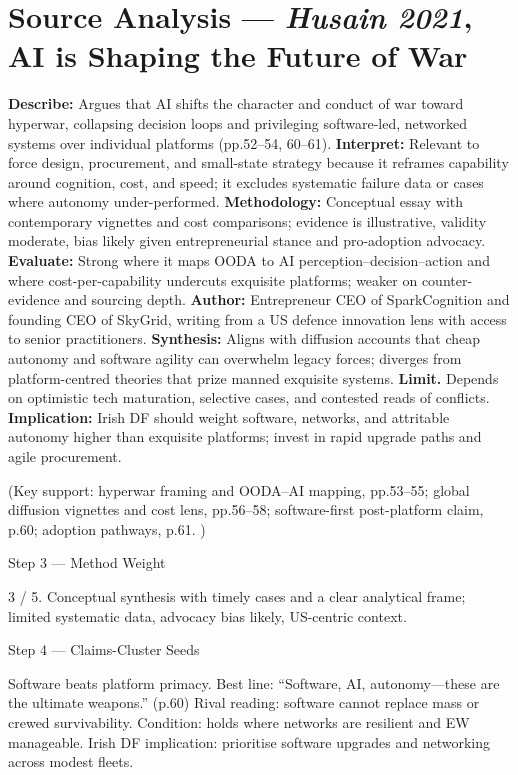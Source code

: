 \section*{Source Analysis — \textit{Husain 2021}, AI is Shaping the Future of War}
\textbf{Describe:} Argues that AI shifts the character and conduct of war toward hyperwar, collapsing decision loops and privileging software-led, networked systems over individual platforms (pp.52–54, 60–61).
\textbf{Interpret:} Relevant to force design, procurement, and small-state strategy because it reframes capability around cognition, cost, and speed; it excludes systematic failure data or cases where autonomy under-performed.
\textbf{Methodology:} Conceptual essay with contemporary vignettes and cost comparisons; evidence is illustrative, validity moderate, bias likely given entrepreneurial stance and pro-adoption advocacy.
\textbf{Evaluate:} Strong where it maps OODA to AI perception–decision–action and where cost-per-capability undercuts exquisite platforms; weaker on counter-evidence and sourcing depth.
\textbf{Author:} Entrepreneur CEO of SparkCognition and founding CEO of SkyGrid, writing from a US defence innovation lens with access to senior practitioners.
\textbf{Synthesis:} Aligns with diffusion accounts that cheap autonomy and software agility can overwhelm legacy forces; diverges from platform-centred theories that prize manned exquisite systems.
\textbf{Limit.} Depends on optimistic tech maturation, selective cases, and contested reads of conflicts.
\textbf{Implication:} Irish DF should weight software, networks, and attritable autonomy higher than exquisite platforms; invest in rapid upgrade paths and agile procurement.

(Key support: hyperwar framing and OODA–AI mapping, pp.53–55; global diffusion vignettes and cost lens, pp.56–58; software-first post-platform claim, p.60; adoption pathways, p.61. )

Step 3 — Method Weight

3 / 5. Conceptual synthesis with timely cases and a clear analytical frame; limited systematic data, advocacy bias likely, US-centric context.

Step 4 — Claims-Cluster Seeds

Software beats platform primacy. Best line: “Software, AI, autonomy—these are the ultimate weapons.” (p.60) Rival reading: software cannot replace mass or crewed survivability. Condition: holds where networks are resilient and EW manageable. Irish DF implication: prioritise software upgrades and networking across modest fleets.

